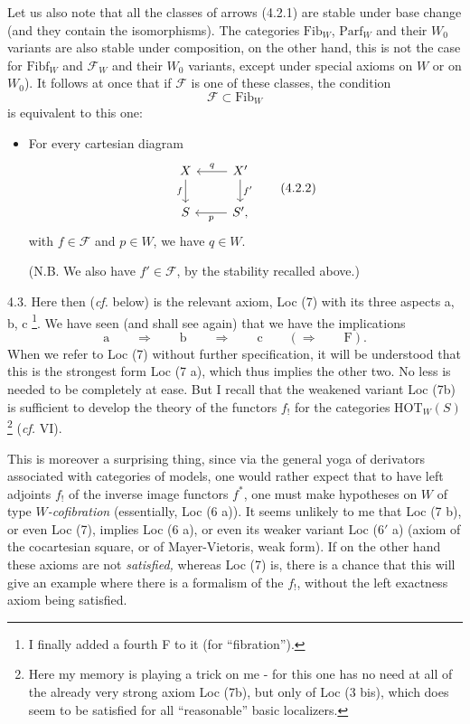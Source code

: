 \documentclass[11pt]{article}
\newcommand{\printedpage}[1]{\marginpar{\footnotesize p.~#1}}
\newcommand{\msp}[1]{\marginpar{\footnotesize [#1]}}
\newcommand{\Fib}{\mathrm{Fib}}
\newcommand{\Fibf}{\mathrm{Fibf}}
\newcommand{\Parf}{\mathrm{Parf}}
\newcommand{\HOT}{\mathrm{HOT}}
\begin{document}
Let us also note that all the classes of arrows (4.2.1) are stable under base change (and they contain the isomorphisms). The categories $\Fib_W$, $\Parf_W$ and their $W_0$ variants are also stable under composition, on the other hand, this is not the case for $\Fibf_W$ and $\mathcal{F}_W$ and their $W_0$ variants, except under special axioms on $W$ or on $W_0$). It follows at once \msp{page 36} that if $\mathcal{F}$ is one of these classes, the condition %
\[
\mathcal{F} \subset \Fib_W
\]
is equivalent to this one:

\begin{itemize}[label={},leftmargin=3.5cm]
\item For every cartesian diagram
\[
\begin{tikzcd}
X \arrow[d, "f"'] & X' \arrow[l, "q"'] \arrow[d, "f'"] \\
S & S', \arrow[l, "p"]
\end{tikzcd}
\tag*{(4.2.2)}
\]
with $f \in \mathcal{F}$ and $p \in W$, we have $q \in W$.

(N.B. We also have $f' \in \mathcal{F}$, by the stability recalled above.)
\end{itemize}

4.3. Here then (\textit{cf.} below) is the relevant axiom, Loc (7) with its three aspects a, b, c \footnote[23]{I finally added a fourth F to it (for ``fibration'').}. We have seen (and shall see again) that we have the implications
\[
\text{a} \qquad \Longrightarrow \qquad \text{b} \qquad \Longrightarrow \qquad \text{c} \qquad (\Longrightarrow \qquad \text{F}).
\]
When we refer to Loc (7) without further specification, it will be understood that this is the strongest form Loc (7 a), which thus implies the other two. No less is needed to be completely at ease. But I recall that the weakened variant Loc (7b) is sufficient to develop the theory of the functors $f_!$ for the categories $\HOT_W(S)$ \footnote[24]{Here my memory is playing a trick on me - for this one has no need at all of the already very strong axiom Loc (7b), but only of Loc (3 bis), which does seem to be satisfied for all ``reasonable'' basic localizers. %
} (\textit{cf.} VI).

\msp{page 37}

This is moreover a surprising thing, since via the general yoga of derivators associated with categories of models, one would rather expect that to have left adjoints $f_!$ of the inverse image functors $f^*$, one must make hypotheses on $W$ of type \textit{$W$-cofibration}
\printedpage{23}
(essentially, Loc (6 a)). It seems unlikely to me that Loc (7 b), or even Loc (7), implies Loc (6 a), or even its weaker variant Loc (6$'$ a) (axiom of the cocartesian square, or of Mayer-Vietoris, weak form). If on the other hand these axioms are not \textit{satisfied,} whereas Loc (7) is, there is a chance that this will give an example where there is a formalism of the $f_!$, without the left exactness axiom being satisfied.
\end{document}
